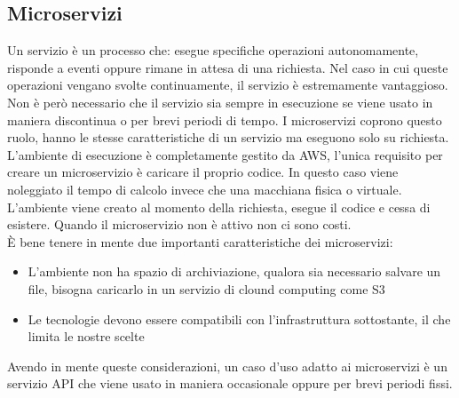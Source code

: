 \documentclass[12pt]{article}
\begin{document}
\subsection{Microservizi}
Un servizio è un processo che: esegue specifiche operazioni autonomamente, 
risponde a eventi oppure rimane in attesa di una richiesta. 
Nel caso in cui queste operazioni vengano svolte continuamente, il servizio è 
estremamente vantaggioso. Non è però necessario che il servizio sia sempre in 
esecuzione se viene usato in maniera discontinua o per brevi periodi di tempo. 
I microservizi coprono questo ruolo, hanno le stesse caratteristiche di un servizio
ma eseguono solo su richiesta. 
\\ L'ambiente di esecuzione è completamente gestito da AWS, l'unica requisito per 
creare un microservizio è caricare il proprio codice. In questo caso viene 
noleggiato il tempo di calcolo invece che una macchiana fisica o virtuale.
L'ambiente viene creato al momento della richiesta, esegue il codice e cessa di 
esistere. 
Quando il microservizio non è attivo non ci sono costi.
\\ È bene tenere in mente due importanti caratteristiche dei microservizi:
\begin{itemize}
  \item L'ambiente non ha spazio di archiviazione, qualora sia necessario 
  salvare un file, bisogna caricarlo in un servizio di clound computing come S3
  \item Le tecnologie devono essere compatibili con l'infrastruttura sottostante,
  il che limita le nostre scelte
\end{itemize}
Avendo in mente queste considerazioni, un caso d'uso adatto ai microservizi 
è un servizio API che viene usato in maniera occasionale oppure per brevi periodi 
fissi.
\end{document}
